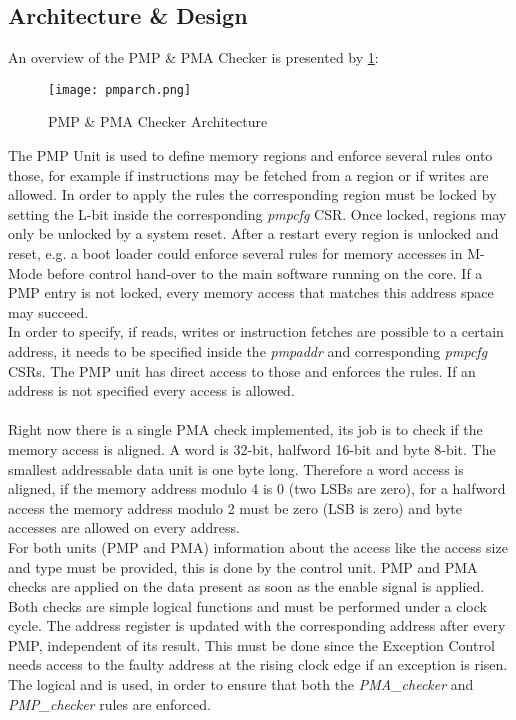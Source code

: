 \subsection{Architecture \& Design}
An overview of the PMP \& PMA Checker is presented by \ref{fig:pmparch}:
\begin{figure}[H]
	\centering
	\texttt{[image: pmparch.png]}
	\caption{PMP \& PMA Checker Architecture}
	\label{fig:pmparch}
\end{figure}
The PMP Unit is used to define memory regions and enforce several rules onto
those, for example if instructions may be fetched from a region or if writes are
allowed. In order to apply the rules the corresponding region must be locked by
setting the L-bit inside the corresponding \textit{pmpcfg} CSR. Once locked, regions may only be unlocked by a system reset. After a restart every region is unlocked and
reset, e.g. a boot loader could enforce several rules for memory accesses in M-Mode before control hand-over to the main software running on the core. If a PMP entry is not locked, every memory access that matches this address space may succeed.
\\
In order to specify, if reads, writes or instruction fetches are possible to a certain address, it needs to be specified inside the \textit{pmpaddr} and corresponding \textit{pmpcfg} CSRs. The PMP unit has direct access to those and enforces the rules. If an address is not specified every access is allowed.\\
\\
Right now there is a single PMA check implemented, its job is to check if the memory
access is aligned. A word is 32-bit, halfword 16-bit and byte 8-bit. The smallest
addressable data unit is one byte long. Therefore a word access is aligned, if the
memory address modulo 4 is 0 (two LSBs are zero), for a halfword access the
memory address modulo 2 must be zero (LSB is zero) and byte accesses are allowed
on every address.
\\
For both units (PMP and PMA) information about the access like the access size
and type must be provided, this is done by the control unit. PMP and PMA checks
are applied on the data present as soon as the enable signal is applied. Both checks
are simple logical functions and must be performed under a clock cycle. The address
register is updated with the corresponding address after every PMP, independent of
its result. This must be done since the Exception Control needs access to the faulty
address at the rising clock edge if an exception is risen.
\\
The logical and is used, in order to ensure that both the \textit{PMA\_checker} and
\textit{PMP\_checker} rules are enforced.
